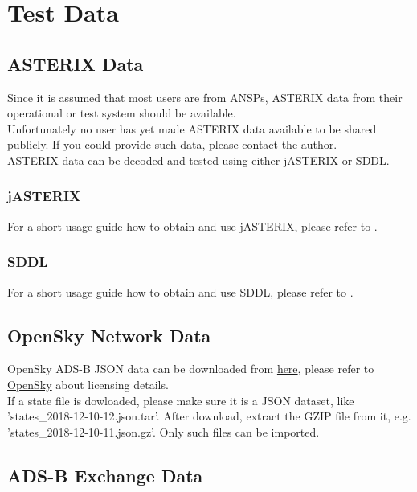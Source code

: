 \chapter{Test Data}
\label{sec:test_data} 

\section{ASTERIX Data}

Since it is assumed that most users are from ANSPs, ASTERIX data from their operational or test system should be available. \\

Unfortunately no user has yet made ASTERIX data available to be shared publicly. If you could provide such data, please contact the author. \\

ASTERIX data can be decoded and tested using either jASTERIX or SDDL.

\subsection{jASTERIX}

For a short usage guide how to obtain and use jASTERIX, please refer to .

\subsection{SDDL}

For a short usage guide how to obtain and use SDDL, please refer to .

\section{OpenSky Network Data}

OpenSky ADS-B JSON data can be downloaded from \href{https://opensky-network.org/datasets/states/}{here}, please refer to \href{https://opensky-network.org/}{OpenSky} about licensing details. \\

If a state file is dowloaded, please make sure it is a JSON dataset, like 'states\_2018-12-10-12.json.tar'. After download, extract the GZIP file from it, e.g. 'states\_2018-12-10-11.json.gz'. Only such files can be imported.

\section{ADS-B Exchange Data}


